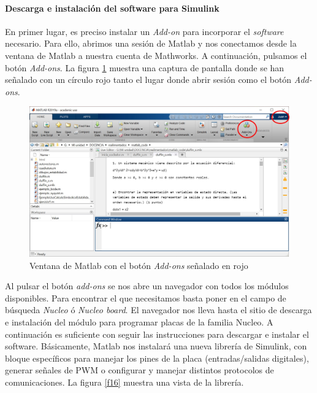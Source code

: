 \documentclass[10pt,a4paper]{report}
\begin{document}
\paragraph{Descarga e instalación del software para Simulink} En primer lugar, es preciso instalar un \emph{Add-on} para incorporar el \emph{software} necesario. Para ello, abrimos una sesión de Matlab y nos conectamos desde la ventana de Matlab a nuestra cuenta de Mathworks. A continuación, pulsamos el botón \emph{Add-ons}. La figura \ref{f15} muestra una captura de pantalla donde se han señalado con un círculo rojo tanto el lugar donde abrir sesión como el botón \emph{Add-ons}.
\begin{figure}
\centering
\includegraphics[scale=0.5]{matlab.jpg}
\caption{Ventana de Matlab con el botón \emph{Add-ons} señalado en rojo}\label{f15}
\end{figure}
Al pulsar el botón \emph{add-ons} se nos abre un navegador con todos los módulos disponibles. Para encontrar el que necesitamos basta poner en el campo de búsqueda \emph{Nucleo} ó \emph{Nucleo board}. El navegador nos lleva hasta el sitio de descarga e instalación del módulo para programar placas de la familia Nucleo. A continuación es suficiente con seguir las instrucciones para descargar e instalar el software. Básicamente, Matlab nos instalará una nueva librería de Simulink, con bloque específicos para manejar los pines de la placa (entradas/salidas digitales), generar señales de PWM o configurar y manejar distintos protocolos de comunicaciones. La figura \ref{f16} muestra una vista de la librería. 
\end{document}
